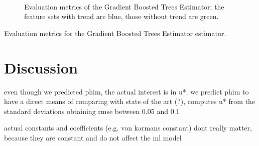 \documentclass[a4paper]{book}
\begin{document}
\begin{figure}
\hfill
{}\\

    \caption{Evaluation metrics of the Gradient Boosted Trees Estimator; the feature sets with trend are blue, those without trend are green.}
	\label{fig:gbr_results}
\end{figure}


\begin{table}[]
\caption{Evaluation metrics for the Gradient Boosted Trees Estimator estimator.}
\label{tbl:gbr_results}

\end{table}



\chapter{Discussion}
\label{ch:discussion}
even though we predicted phim, the actual interest is in u*. we predict phim to have a direct means of comparing with state of the art (?), \cite{weber1999} computes u* from the standard deviations obtaining rmse between 0.05 and 0.1

actual constants and coefficients (e.g. von karmans constant) dont really matter, because they are constant and do not affect the ml model 
\end{document}
